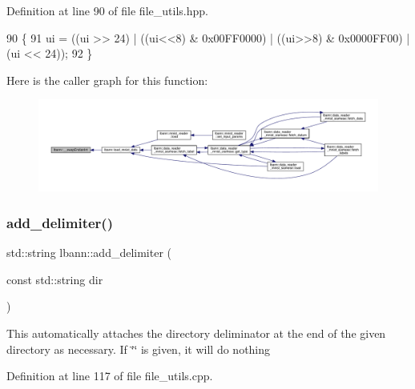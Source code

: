 Definition at line 90 of file file\+\_\+utils.\+hpp.


\begin{DoxyCode}
90                                               \{
91   ui = ((ui >> 24) | ((ui<<8) & 0x00FF0000) | ((ui>>8) & 0x0000FF00) | (ui << 24));
92 \}
\end{DoxyCode}
Here is the caller graph for this function\+:\nopagebreak
\begin{figure}[H]
\begin{center}
\leavevmode
\includegraphics[width=350pt]{namespacelbann_a0fd8bc0ad31da913a124683f5ec4fdf1_icgraph}
\end{center}
\end{figure}
\mbox{\label{namespacelbann_a1b8b05bbf2e59808a51ead80c47a9359}} 
\subsubsection{\texorpdfstring{add\+\_\+delimiter()}{add\_delimiter()}}
{\footnotesize\ttfamily std\+::string lbann\+::add\+\_\+delimiter (\begin{DoxyParamCaption}\item[{const std\+::string}]{dir }\end{DoxyParamCaption})}

This automatically attaches the directory deliminator at the end of the given directory as necessary. If \char`\"{}\char`\"{} is given, it will do nothing 

Definition at line 117 of file file\+\_\+utils.\+cpp.


